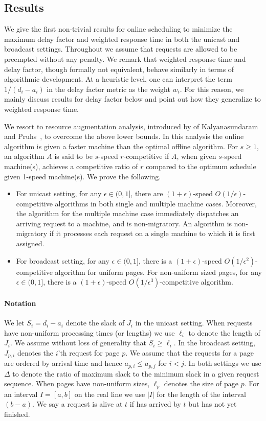 \documentclass[10pt]{article}
\theoremstyle{definition}
\numberwithin{equation}{section}
\newcommand{\eps}{\epsilon}
\begin{document}
\subsection{Results}
We give the first non-trivial results for online scheduling to minimize the
maximum delay factor and weighted response time in both the unicast
and broadcast settings. Throughout we assume that requests are
allowed to be preempted without any penalty.  We remark that
weighted response time and delay factor, though formally not
equivalent, behave similarly in terms of algorithmic development. At
a heuristic level, one can interpret the term ${1}/{(d_i-a_i)}$ in
the delay factor metric as the weight $w_i$. For this reason, we
mainly discuss results for delay factor below and point out how they
generalize to weighted response time.

We resort to resource augmentation analysis, introduced by of
Kalyanasundaram and Pruhs~\cite{KalyanasundaramP95}, to overcome the
above lower bounds. In this analysis the online algorithm is given a
faster machine than the optimal offline algorithm. For $s \ge 1$, an
algorithm $A$ is said to be $s$-speed $r$-competitive if $A$, when
given $s$-speed machine(s), achieves a competitive ratio of $r$
compared to the optimum  schedule given 1-speed machine(s).
We prove the following.
\begin{itemize}
\item For unicast setting, for any $\eps \in (0,1]$, there are
  $(1+\eps)$-speed $O(1/\eps)$-competitive algorithms in both single
  and multiple machine cases. Moreover, the algorithm for the multiple
  machine case immediately dispatches an arriving request to a
  machine, and is non-migratory. An algorithm is non-migratory
  if it processes each request on a single machine to which it is
  first assigned.

\item For broadcast setting, for any $\eps \in (0,1]$, there is a
  $(1+\eps)$-speed $O(1/\eps^2)$-competitive algorithm for uniform
  pages.  For non-uniform sized pages, for any $\eps \in (0,1]$, there
  is a $(1+\eps)$-speed $O(1/\eps^3)$-competitive algorithm.
\end{itemize}

\paragraph{Notation}
We let $S_i = d_i - a_i$ denote the slack of $J_i$ in the unicast
setting. When requests have non-uniform processing times (or lengths) we
use $\ell_i$ to denote the length of $J_i$. We assume without loss
of generality that $S_i \ge \ell_i$. In the broadcast setting,
$J_{p,i}$ denotes the $i$'th request for page $p$. We assume that the
requests for a page are ordered by arrival time and hence $a_{p,i}
\le a_{p,j}$ for $i < j$. In both settings we use $\Delta$ to denote
the ratio of maximum slack to the minimum slack in a given request
sequence. When pages have non-uniform sizes, $\ell_p$ denotes the size of page $p$.  For an interval $I = [a,b]$ on the real line we use $|I|$
for the length of the interval $(b-a)$. We say a request is alive
 at $t$ if has arrived by $t$ but has not yet finished.
\setcounter{section}{1}
\end{document}
